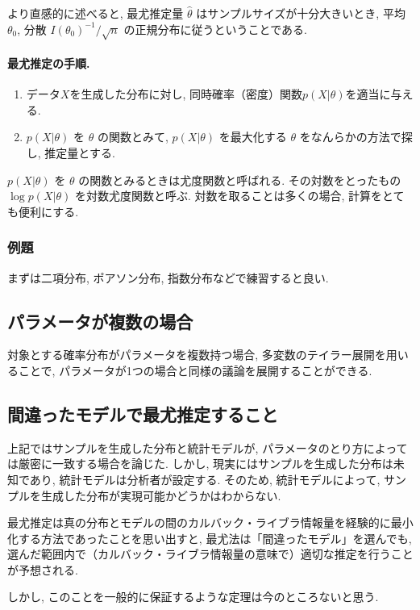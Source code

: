 \documentclass{jarticle}
\begin{document}
より直感的に述べると, 最尤推定量 $\hat \theta$ はサンプルサイズが十分大きいとき, 平均 $\theta_0$, 分散 $I(\theta_0)^{-1}/\sqrt{n}$ の正規分布に従うということである. 

\paragraph{最尤推定の手順.} 
\begin{enumerate}
\item データ$X$を生成した分布に対し, 同時確率（密度）関数$p(X|\theta)$を適当に与える. 
\item $p(X|\theta)$ を $\theta$ の関数とみて, $p(X|\theta)$ を最大化する $\theta$ をなんらかの方法で探し, 推定量とする.
\end{enumerate}
$p(X|\theta)$ を $\theta$ の関数とみるときは尤度関数と呼ばれる. その対数をとったもの $\log p(X|\theta)$ を対数尤度関数と呼ぶ. 対数を取ることは多くの場合, 計算をとても便利にする. 

\subsubsection{例題}
まずは二項分布, ポアソン分布, 指数分布などで練習すると良い.

\subsection{パラメータが複数の場合}

対象とする確率分布がパラメータを複数持つ場合, 多変数のテイラー展開を用いることで, パラメータが1つの場合と同様の議論を展開することができる. 



\subsection{間違ったモデルで最尤推定すること}
上記ではサンプルを生成した分布と統計モデルが, パラメータのとり方によっては厳密に一致する場合を論じた. しかし, 現実にはサンプルを生成した分布は未知であり, 統計モデルは分析者が設定する. そのため, 統計モデルによって, サンプルを生成した分布が実現可能かどうかはわからない. 

最尤推定は真の分布とモデルの間のカルバック・ライブラ情報量を経験的に最小化する方法であったことを思い出すと, 最尤法は「間違ったモデル」を選んでも, 選んだ範囲内で（カルバック・ライブラ情報量の意味で）適切な推定を行うことが予想される. 

しかし, このことを一般的に保証するような定理は今のところないと思う. 
\end{document}
